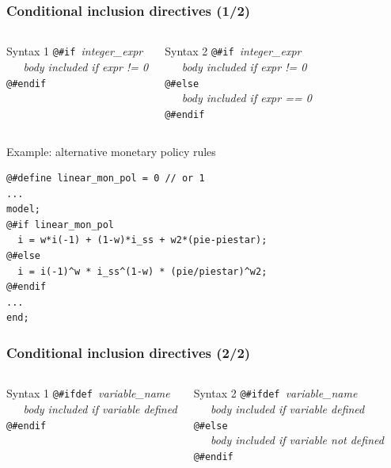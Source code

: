 \documentclass{beamer}
\begin{document}
\begin{frame}[fragile=singleslide]
  \frametitle{Conditional inclusion directives (1/2)}

  \begin{columns}[T]
    \begin{block}{Syntax 1}
\verb+@#if +\textit{integer\_expr} \\
\verb+   +\textit{body included if expr != 0} \\
\verb+@#endif+
    \end{block}

    \begin{block}{Syntax 2}
\verb+@#if +\textit{integer\_expr} \\
\verb+   +\textit{body included if expr != 0} \\
\verb+@#else+ \\
\verb+   +\textit{body included if expr == 0} \\
\verb+@#endif+
    \end{block}
  \end{columns}

  \begin{block}{Example: alternative monetary policy rules}
    \scriptsize
\begin{verbatim}
@#define linear_mon_pol = 0 // or 1
...
model;
@#if linear_mon_pol
  i = w*i(-1) + (1-w)*i_ss + w2*(pie-piestar);
@#else
  i = i(-1)^w * i_ss^(1-w) * (pie/piestar)^w2;
@#endif
...
end;
\end{verbatim}
    \scriptsize
  \end{block}
\end{frame}

\begin{frame}[fragile=singleslide]
  \frametitle{Conditional inclusion directives (2/2)}

  \begin{columns}[T]
    \begin{block}{Syntax 1}
\verb+@#ifdef +\textit{variable\_name} \\
\verb+   +\textit{body included if variable defined} \\
\verb+@#endif+
    \end{block}

    \begin{block}{Syntax 2}
\verb+@#ifdef +\textit{variable\_name} \\
\verb+   +\textit{body included if variable defined} \\
\verb+@#else+ \\
\verb+   +\textit{body included if variable not defined} \\
\verb+@#endif+
    \end{block}
  \end{columns}
\end{frame}
\end{document}

